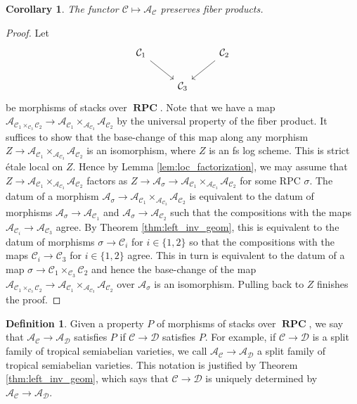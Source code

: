 \documentclass[11pt]{amsart}
\newtheorem{corollary}[theorem]{Corollary}
\theoremstyle{definition}
\newtheorem{definition}[theorem]{Definition}
\theoremstyle{remark}
\DeclareMathOperator{\RPC}{\mathbf{RPC}}
\begin{document}
\begin{corollary}
	\label{cor:fib_prods_preserved}
	The functor $\mathcal{C}\mapsto \mathcal{A}_{\mathcal{C}}$ preserves fiber products.
\end{corollary}

\begin{proof}
	Let
	$$\begin{tikzcd}
		\mathcal{C}_1\arrow[dr]&&\mathcal{C}_2\arrow[dl]\\
					 &\mathcal{C}_3&
	\end{tikzcd}$$
	be morphisms of stacks over $\RPC$.
	Note that we have a map $\mathcal{A}_{\mathcal{C}_1\times_{\mathcal{C}_3}\mathcal{C}_2}\to \mathcal{A}_{\mathcal{C}_1}\times_{\mathcal{A}_{\mathcal{C}_3}}\mathcal{A}_{\mathcal{C}_2}$
	by the universal property of the fiber product. It suffices to show that the base-change of this
	map along any morphism $Z\to \mathcal{A}_{\mathcal{C}_1}\times_{\mathcal{A}_{\mathcal{C}_3}}\mathcal{A}_{\mathcal{C}_2}$
	is an isomorphism, where $Z$ is an fs log scheme. This is strict étale local on $Z$.
	Hence by Lemma \ref{lem:loc_factorization}, we may assume that
	$Z\to \mathcal{A}_{\mathcal{C}_1}\times_{\mathcal{A}_{\mathcal{C}_3}}\mathcal{A}_{\mathcal{C}_2}$ factors as
	$Z\to \mathcal{A}_{\sigma}\to \mathcal{A}_{\mathcal{C}_1}\times_{\mathcal{A}_{\mathcal{C}_3}}\mathcal{A}_{\mathcal{C}_2}$
	for some RPC $\sigma$.
	The datum of a morphism $\mathcal{A}_{\sigma}\to \mathcal{A}_{\mathcal{C}_1}\times_{\mathcal{A}_{\mathcal{C}_3}}\mathcal{A}_{\mathcal{C}_2}$
	is equivalent to the datum of morphisms $\mathcal{A}_{\sigma}\to \mathcal{A}_{\mathcal{C}_1}$ and
	$\mathcal{A}_{\sigma}\to \mathcal{A}_{\mathcal{C}_2}$ such that the compositions with the maps $\mathcal{A}_{\mathcal{C}_i}\to \mathcal{A}_{\mathcal{C}_3}$
	agree. By Theorem \ref{thm:left_inv_geom}, this is equivalent to the datum of morphisms $\sigma\to \mathcal{C}_i$ for $i\in \{1,2\}$
	so that the compositions with the maps $\mathcal{C}_i\to \mathcal{C}_3$ for $i\in \{1,2\}$ agree. This in turn is equivalent
	to the datum of a map $\sigma\to \mathcal{C}_1\times_{\mathcal{C}_3}\mathcal{C}_2$ and hence the base-change
	of the map $\mathcal{A}_{\mathcal{C}_1\times_{\mathcal{C}_3}\mathcal{C}_2}\to \mathcal{A}_{\mathcal{C}_1}\times_{\mathcal{A}_{\mathcal{C}_3}}\mathcal{A}_{\mathcal{C}_2}$
	over $\mathcal{A}_{\sigma}$ is an isomorphism. Pulling back to $Z$ finishes the proof.
\end{proof}

\begin{definition}
	Given a property $P$ of morphisms of stacks over $\RPC$, we say that $\mathcal{A}_{\mathcal{C}}\to \mathcal{A}_{\mathcal{D}}$ satisfies $P$ if
	$\mathcal{C}\to \mathcal{D}$ satisfies $P$. For example, if $\mathcal{C}\to \mathcal{D}$ is a split family of tropical semiabelian varieties,
	we call $\mathcal{A}_{\mathcal{C}}\to \mathcal{A}_{\mathcal{D}}$ a split family of tropical semiabelian varieties.
	This notation is justified by Theorem \ref{thm:left_inv_geom}, which says that $\mathcal{C}\to \mathcal{D}$ is uniquely determined
	by $\mathcal{A}_{\mathcal{C}}\to \mathcal{A}_{\mathcal{D}}$.
\end{definition}
\end{document}
